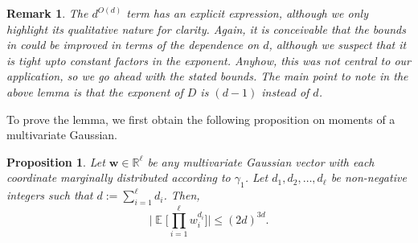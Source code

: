 \documentclass[11pt]{article}
\DeclareMathOperator*{\Ex}{\mathbb{E}}
\newcommand{\bw}{{\bm w}}
\newtheorem{proposition}[theorem]{Proposition}
\newtheorem{remark}[theorem]{Remark}
\begin{document}
\begin{remark}
	The $d^{O(d)}$ term has an explicit expression, although we only highlight its qualitative nature for clarity. Again, it is conceivable that the bounds in  could be improved in terms of the dependence on $d$, although we suspect that it is tight upto constant factors in the exponent. Anyhow, this was not central to our application, so we go ahead with the stated bounds. The main point to note in the above lemma is that the exponent of $D$ is $(d-1)$ instead of $d$.
\end{remark}

\noindent To prove the lemma, we first obtain the following proposition on moments of a multivariate Gaussian.

\begin{proposition}\label{prop:mag_mom_multi_Gauss}
	Let $\bw \in \mathbb{R}^{\ell}$ be any multivariate Gaussian vector with each coordinate marginally distributed according to $\gamma_1$. Let $d_1, d_2, \dots, d_{\ell}$ be non-negative integers such that $d := \sum_{i=1}^{\ell} d_i$. Then,
	\begin{equation}
	\bigg|  \Ex \bigg[ \prod_{i=1}^{\ell} w_i^{d_i} \bigg] \bigg| \le (2d)^{3d}.
	\end{equation}
\end{proposition}
\end{document}
